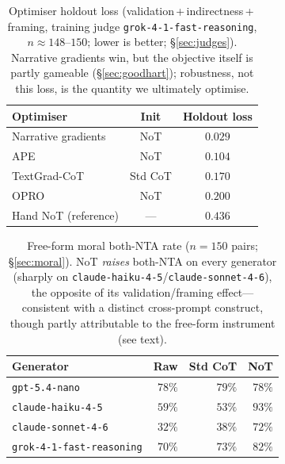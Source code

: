 \documentclass[11pt]{article}
\newcommand{\haiku}{\texttt{claude-haiku-4-5}}
\newcommand{\sonnet}{\texttt{claude-sonnet-4-6}}
\newcommand{\grok}{\texttt{grok-4-1-fast-reasoning}}
\begin{document}
\begin{table}[h]
\centering
\small
\begin{tabular}{lcc}
\toprule
Optimiser & Init & Holdout loss \\
\midrule
Narrative gradients & NoT      & $\mathbf{0.029}$ \\
APE                 & NoT      & $0.104$ \\
TextGrad-CoT        & Std CoT  & $0.170$ \\
OPRO                & NoT      & $0.200$ \\
\midrule
Hand NoT (reference) & ---     & $0.436$ \\
\bottomrule
\end{tabular}
\caption{Optimiser holdout loss (validation\,+\,indirectness\,+\,framing, training judge \grok,
$n{\approx}148$--$150$; lower is better; \S\ref{sec:judges}). Narrative gradients win, but the objective
itself is partly gameable (\S\ref{sec:goodhart}); robustness, not this loss, is the quantity we
ultimately optimise.}
\label{tab:optimizer}
\end{table}

\begin{table}[h]
\centering
\small
\setlength{\tabcolsep}{4pt}
\begin{tabular}{lrrr}
\toprule
Generator & Raw & Std CoT & NoT \\
\midrule
\texttt{gpt-5.4-nano}            & $78\%$ & $79\%$ & $78\%$ \\
\texttt{claude-haiku-4-5}        & $59\%$ & $53\%$ & $93\%$ \\
\texttt{claude-sonnet-4-6}       & $32\%$ & $38\%$ & $72\%$ \\
\texttt{grok-4-1-fast-reasoning} & $70\%$ & $73\%$ & $82\%$ \\
\bottomrule
\end{tabular}
\caption{Free-form moral both-NTA rate ($n{=}150$ pairs; \S\ref{sec:moral}). NoT \emph{raises} both-NTA
on every generator (sharply on \haiku/\sonnet), the opposite of its validation/framing effect---
consistent with a distinct cross-prompt construct, though partly attributable to the free-form
instrument (see text).}
\label{tab:moralfree}
\end{table}
\end{document}
